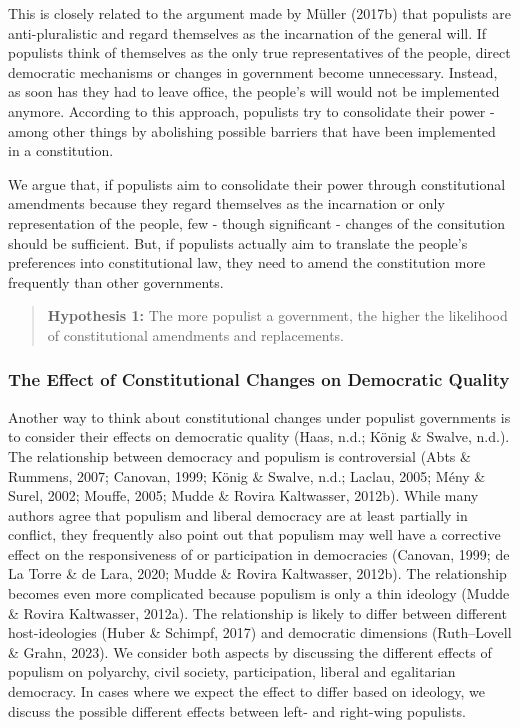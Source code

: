 \documentclass[
  abstract]{article}
\begin{document}
This is closely related to the argument made by Müller (2017b) that
populists are anti-pluralistic and regard themselves as the incarnation
of the general will. If populists think of themselves as the only true
representatives of the people, direct democratic mechanisms or changes
in government become unnecessary. Instead, as soon has they had to leave
office, the people's will would not be implemented anymore. According to
this approach, populists try to consolidate their power - among other
things by abolishing possible barriers that have been implemented in a
constitution.

We argue that, if populists aim to consolidate their power through
constitutional amendments because they regard themselves as the
incarnation or only representation of the people, few - though
significant - changes of the consitution should be sufficient. But, if
populists actually aim to translate the people's preferences into
constitutional law, they need to amend the constitution more frequently
than other governments.

\begin{quote}
\textbf{Hypothesis 1:} The more populist a government, the higher the
likelihood of constitutional amendments and replacements.
\end{quote}

\hypertarget{the-effect-of-constitutional-changes-on-democratic-quality}{%
\subsubsection{The Effect of Constitutional Changes on Democratic
Quality}\label{the-effect-of-constitutional-changes-on-democratic-quality}}

Another way to think about constitutional changes under populist
governments is to consider their effects on democratic quality (Haas,
n.d.; König \& Swalve, n.d.). The relationship between democracy and
populism is controversial (Abts \& Rummens, 2007; Canovan, 1999; König
\& Swalve, n.d.; Laclau, 2005; Mény \& Surel, 2002; Mouffe, 2005; Mudde
\& Rovira Kaltwasser, 2012b). While many authors agree that populism and
liberal democracy are at least partially in conflict, they frequently
also point out that populism may well have a corrective effect on the
responsiveness of or participation in democracies (Canovan, 1999; de La
Torre \& de Lara, 2020; Mudde \& Rovira Kaltwasser, 2012b). The
relationship becomes even more complicated because populism is only a
thin ideology (Mudde \& Rovira Kaltwasser, 2012a). The relationship is
likely to differ between different host-ideologies (Huber \& Schimpf,
2017) and democratic dimensions (Ruth--Lovell \& Grahn, 2023). We
consider both aspects by discussing the different effects of populism on
polyarchy, civil society, participation, liberal and egalitarian
democracy. In cases where we expect the effect to differ based on
ideology, we discuss the possible different effects between left- and
right-wing populists.
\end{document}
